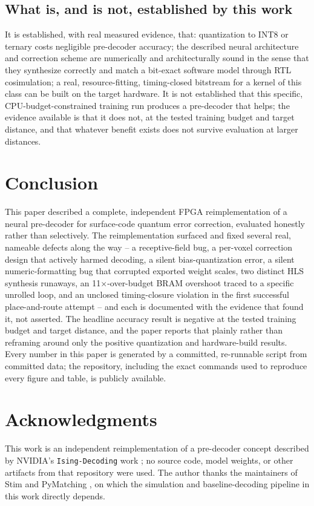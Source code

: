 \documentclass[pdflatex,sn-basic]{sn-jnl}
\begin{document}
\subsection{What is, and is not, established by this work}\label{subsec:discussion-established}
It is established, with real measured evidence, that: quantization to INT8 or ternary costs negligible pre-decoder accuracy; the described neural architecture and correction scheme are numerically and architecturally sound in the sense that they synthesize correctly and match a bit-exact software model through RTL cosimulation; a real, resource-fitting, timing-closed bitstream for a kernel of this class can be built on the target hardware. It is not established that this specific, CPU-budget-constrained training run produces a pre-decoder that helps; the evidence available is that it does not, at the tested training budget and target distance, and that whatever benefit exists does not survive evaluation at larger distances.

\section{Conclusion}\label{sec:conclusion}

This paper described a complete, independent FPGA reimplementation of a neural pre-decoder for surface-code quantum error correction, evaluated honestly rather than selectively. The reimplementation surfaced and fixed several real, nameable defects along the way -- a receptive-field bug, a per-voxel correction design that actively harmed decoding, a silent bias-quantization error, a silent numeric-formatting bug that corrupted exported weight scales, two distinct HLS synthesis runaways, an 11\(\times\)-over-budget BRAM overshoot traced to a specific unrolled loop, and an unclosed timing-closure violation in the first successful place-and-route attempt -- and each is documented with the evidence that found it, not asserted. The headline accuracy result is negative at the tested training budget and target distance, and the paper reports that plainly rather than reframing around only the positive quantization and hardware-build results. Every number in this paper is generated by a committed, re-runnable script from committed data; the repository, including the exact commands used to reproduce every figure and table, is publicly available.

\backmatter

\section*{Acknowledgments}
This work is an independent reimplementation of a pre-decoder concept described by NVIDIA's \texttt{Ising-Decoding} work \cite{chamberland2026fast}; no source code, model weights, or other artifacts from that repository were used. The author thanks the maintainers of Stim \cite{gidney2021stim} and PyMatching \cite{higgott2022pymatching}, on which the simulation and baseline-decoding pipeline in this work directly depends.
\end{document}
